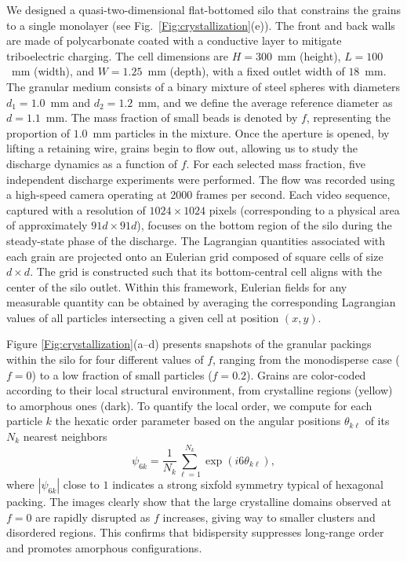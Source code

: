 \documentclass[twocolumn,aps,prl,superscriptaddress,showpacs,byrevtex]{revtex4-2}
\begin{document}
We designed a quasi-two-dimensional flat-bottomed silo that constrains the grains to a single monolayer (see Fig.~\ref{Fig:crystallization}(e)). The front and back walls are made of polycarbonate coated with a conductive layer to mitigate triboelectric charging. The cell dimensions are $H = 300$~mm (height), $L = 100$~mm (width), and $W = 1.25$~mm (depth), with a fixed outlet width of $18$~mm. The granular medium consists of a binary mixture of steel spheres with diameters $d_1 = 1.0$~mm and $d_2 = 1.2$~mm, and we define the average reference diameter as $d = 1.1$~mm. The mass fraction of small beads is denoted by $f$, representing the proportion of $1.0$~mm particles in the mixture. Once the aperture is opened, by lifting a retaining wire, grains begin to flow out, allowing us to study the discharge dynamics as a function of $f$. For each selected mass fraction, five independent discharge experiments were performed. The flow was recorded using a high-speed camera operating at 2000 frames per second. Each video sequence, captured with a resolution of $1024 \times 1024$ pixels (corresponding to a physical area of approximately $91d \times 91d$), focuses on the bottom region of the silo during the steady-state phase of the discharge. The Lagrangian quantities associated with each grain are projected onto an Eulerian grid composed of square cells of size $d \times d$. The grid is constructed such that its bottom-central cell aligns with the center of the silo outlet. Within this framework, Eulerian fields for any measurable quantity can be obtained by averaging the corresponding Lagrangian values of all particles intersecting a given cell at position $(x, y)$.


Figure \ref{Fig:crystallization}(a–d) presents snapshots of the granular packings within the silo for four different values of $f$, ranging from the monodisperse case ($f=0$) to a low fraction of small particles ($f=0.2$). Grains are color-coded according to their local structural environment, from crystalline regions (yellow) to amorphous ones (dark). To quantify the local order, we compute for each particle $k$ the hexatic order parameter based on the angular positions $\theta_{k\ell}$ of its $N_k$ nearest neighbors
\begin{equation}
\psi_{6k} = \frac{1}{N_k} \sum_{\ell=1}^{N_k} \exp\left(i6\theta_{k\ell}\right),
\label{Eq:hexatic_parameter}
\end{equation}
where $|\psi_{6k}|$ close to $1$ indicates a strong sixfold symmetry typical of hexagonal packing. The images clearly show that the large crystalline domains observed at $f=0$ are rapidly disrupted as $f$ increases, giving way to smaller clusters and disordered regions. This confirms that bidispersity suppresses long-range order and promotes amorphous configurations.
\end{document}
